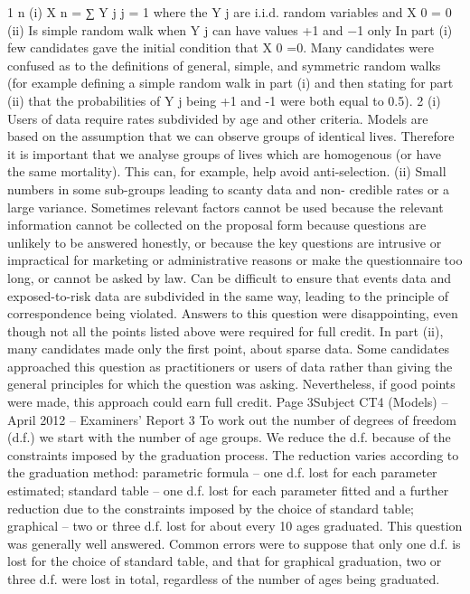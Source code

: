 1
n
(i)
X n = ∑ Y j
j = 1
where the Y j are i.i.d. random variables and X 0 = 0
(ii)
Is simple random walk when Y j can have values +1 and −1 only
In part (i) few candidates gave the initial condition that X 0 =0. Many candidates were
confused as to the definitions of general, simple, and symmetric random walks (for example
defining a simple random walk in part (i) and then stating for part (ii) that the probabilities
of Y j being +1 and -1 were both equal to 0.5).
2
(i)
Users of data require rates subdivided by age and other criteria.
Models are based on the assumption that we can observe groups of identical lives.
Therefore it is important that we analyse groups of lives which are homogenous (or
have the same mortality).
This can, for example, help avoid anti-selection.
(ii)
Small numbers in some sub-groups leading to scanty data and non-
credible rates or a large variance.
Sometimes relevant factors cannot be used because the relevant information cannot be
collected on the proposal form because questions are unlikely to be answered
honestly,
or because the key questions are intrusive or impractical for marketing or
administrative reasons or make the questionnaire too long, or cannot be asked by law.
Can be difficult to ensure that events data and exposed-to-risk data are subdivided in
the same way, leading to the principle of correspondence being violated.
Answers to this question were disappointing, even though not all the points listed above were
required for full credit. In part (ii), many candidates made only the first point, about sparse
data. Some candidates approached this question as practitioners or users of data rather than
giving the general principles for which the question was asking. Nevertheless, if good points
were made, this approach could earn full credit.
Page 3Subject CT4 (Models) – April 2012 – Examiners’ Report
3
To work out the number of degrees of freedom (d.f.) we start with the number of age groups.
We reduce the d.f. because of the constraints imposed by the graduation process.
The reduction varies according to the graduation method:
parametric formula – one d.f. lost for each parameter estimated;
standard table – one d.f. lost for each parameter fitted and a further reduction due to the
constraints imposed by the choice of standard table;
graphical – two or three d.f. lost for about every 10 ages graduated.
This question was generally well answered. Common errors were to suppose that only one
d.f. is lost for the choice of standard table, and that for graphical graduation, two or three
d.f. were lost in total, regardless of the number of ages being graduated.
